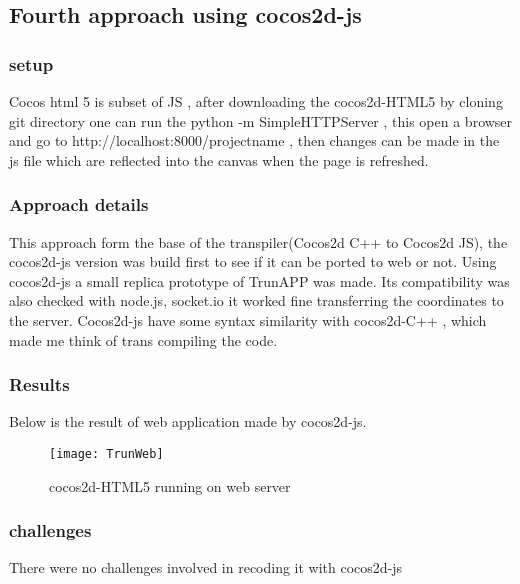 \documentclass[23pt]{article}
\begin{document}
\subsection{Fourth approach using cocos2d-js }

\subsubsection{setup}

{\Large Cocos html 5 is subset of JS , after downloading the cocos2d-HTML5 by cloning git directory one can run the python -m SimpleHTTPServer ,
this open a browser and go to http://localhost:8000/projectname , then changes can be made in the js file which are reflected into the canvas when the page is refreshed.
\\ \par}
\subsubsection{Approach details}

{\Large This approach form the base of the transpiler(Cocos2d C++ to Cocos2d JS), the cocos2d-js version was build first to see if it can be ported to web or not. Using cocos2d-js a small replica prototype of TrunAPP was made. Its compatibility was also checked with node.js, socket.io it worked  fine transferring the coordinates to the server.  
Cocos2d-js have some syntax similarity with cocos2d-C++ , which made me think of trans compiling the code. \cite{cocoshtmlsetup}  \par}

\subsubsection{Results}

{\Large Below is the result of web application made by cocos2d-js. \par}

\begin{figure}[h]
\caption{cocos2d-HTML5 running on web server}
\centering
\texttt{[image: TrunWeb]}
\end{figure}

\subsubsection{challenges}

{\Large There were no challenges involved in recoding it with cocos2d-js \par}
\end{document}
